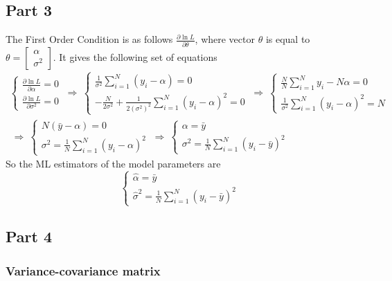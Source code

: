 \documentclass[12pt, a4paper]{article}\usepackage[]{graphicx}\usepackage[]{color}
\begin{document}
\subsection{Part 3}
The First Order Condition is as follows $\frac{\partial \ln L}{\partial \theta} $, where vector $\theta$ is equal to
$ \theta = 
  \begin{bmatrix}  
    \alpha\\
    \sigma^2
  \end{bmatrix} $.
% 
%
It gives the following set of equations
\begin{gather*}
\begin{cases}
  \frac{\partial \ln L}{\partial \alpha} = 0 \\
  \frac{\partial \ln L}{\partial \sigma^2} = 0 
  \end{cases}
\ \Rightarrow \ 
\begin{cases}
  \frac{1}{\sigma^2} \sum_{i=1}^N (y_i-\alpha) = 0 \\
  -\frac{N}{2\sigma^2} + \frac{1}{2(\sigma^2)^2} \sum_{i=1}^N (y_i-\alpha)^2 = 0
\end{cases}
\ \Rightarrow \ 
\begin{cases}
  \frac{N}{N} \sum_{i=1}^N y_i - N \alpha = 0\\
  \frac{1}{\sigma^2} \sum_{i=1}^N (y_i-\alpha)^2 = N
\end{cases} \\
\ \Rightarrow \ 
\begin{cases}
  N (\bar{y}-\alpha) = 0\\
  \sigma^2 = \frac{1}{N} \sum_{i=1}^N (y_i-\alpha)^2
\end{cases}
\ \Rightarrow \ 
\begin{cases}
  \alpha = \bar{y} \\
  \sigma^2 = \frac{1}{N} \sum_{i=1}^N (y_i-\bar{y})^2
\end{cases}
\end{gather*}
%
So the ML estimators of the model parameters are
\[ \begin{cases}
  \hat{\alpha} = \bar{y}\\
  \hat{\sigma}^2 = \frac{1}{N} \sum_{i=1}^N (y_i-\bar{y})^2
\end{cases}
\]




\subsection{Part 4}
\subsubsection{Variance-covariance matrix}
\end{document}
